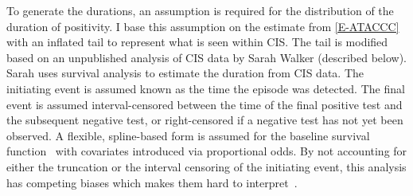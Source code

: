 \documentclass[thesis.tex]{subfiles}
\begin{document}
To generate the durations, an assumption is required for the distribution of the duration of positivity.
I base this assumption on the estimate from \cref{E-ATACCC} with an inflated tail to represent what is seen within CIS.
The tail is modified based on an unpublished analysis of CIS data by Sarah Walker (described below).
Sarah uses survival analysis to estimate the duration from CIS data.
The initiating event is assumed known as the time the episode was detected.
The final event is assumed interval-censored between the time of the final positive test and the subsequent negative test, or right-censored if a negative test has not yet been observed.
A flexible, spline-based form is assumed for the baseline survival function~\autocite{roystonSTPM,roystonFlexible} with covariates introduced via proportional odds.
By not accounting for either the truncation or the interval censoring of the initiating event, this analysis has competing biases which makes them hard to interpret~\autocite{cisMethodsONS}.

\end{document}
